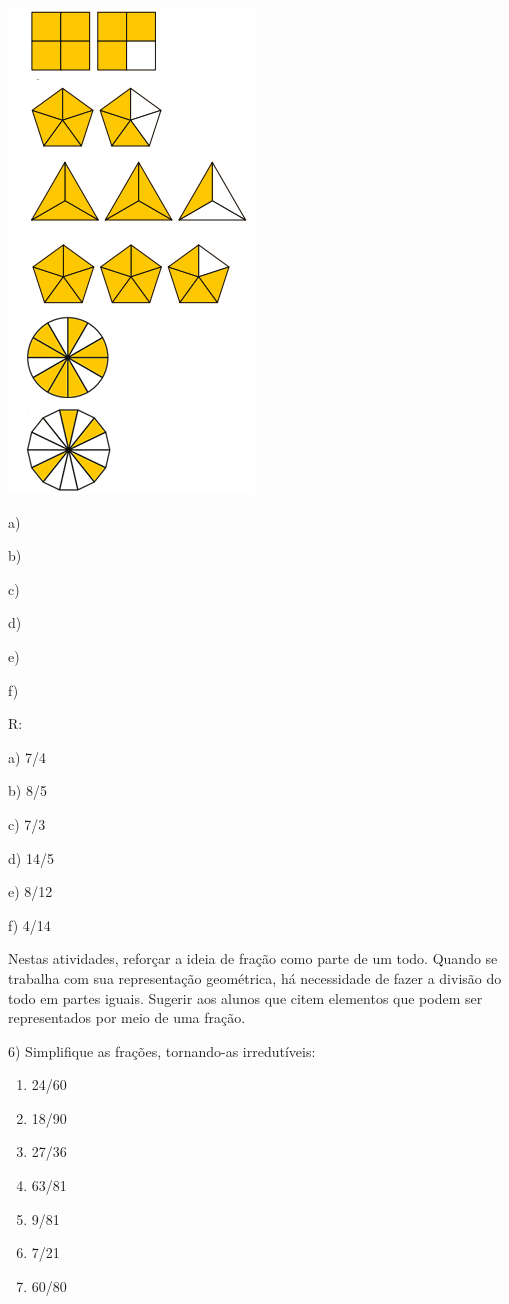 \includegraphics[width=2.57292in,height=5.0625in]{./imgSAEB_6_MAT/media/image32.png}

a)

b)

c)

d)

e)

f)

R:

a) 7/4

b) 8/5

c) 7/3

d) 14/5

e) 8/12

f) 4/14

Nestas atividades, reforçar a ideia de fração como parte de um todo.
Quando se trabalha com sua representação geométrica, há necessidade de
fazer a divisão do todo em partes iguais. Sugerir aos alunos que citem
elementos que podem ser representados por meio de uma fração.

6) Simplifique as frações, tornando-as irredutíveis:

\begin{enumerate}
\def\labelenumi{\alph{enumi})}
\item
  24/60
\item
  18/90
\item
  27/36
\item
  63/81
\item
  9/81
\item
  7/21
\item
  60/80
\end{enumerate}

